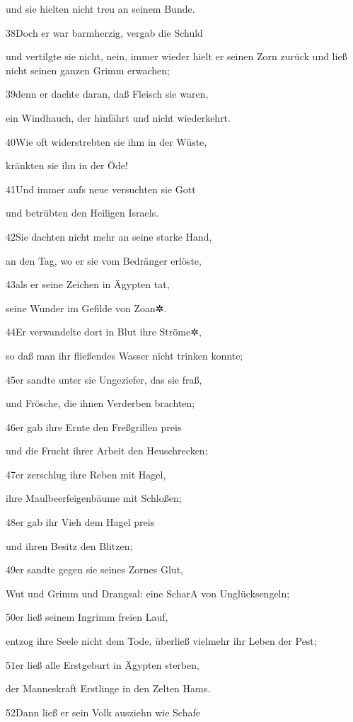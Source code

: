 und sie hielten nicht treu an seinem Bunde.

38Doch er war barmherzig, vergab die Schuld

und vertilgte sie nicht, nein, immer wieder hielt er seinen Zorn zurück
und ließ nicht seinen ganzen Grimm erwachen;

39denn er dachte daran, daß Fleisch sie waren,

ein Windhauch, der hinfährt und nicht wiederkehrt.

40Wie oft widerstrebten sie ihm in der Wüste,

kränkten sie ihn in der Öde!

41Und immer aufs neue versuchten sie Gott

und betrübten den Heiligen Israels.

42Sie dachten nicht mehr an seine starke Hand,

an den Tag, wo er sie vom Bedränger erlöste,

43als er seine Zeichen in Ägypten tat,

seine Wunder im Gefilde von Zoan✲.

44Er verwandelte dort in Blut ihre Ströme✲,

so daß man ihr fließendes Wasser nicht trinken konnte;

45er sandte unter sie Ungeziefer, das sie fraß,

und Frösche, die ihnen Verderben brachten;

46er gab ihre Ernte den Freßgrillen preis

und die Frucht ihrer Arbeit den Heuschrecken;

47er zerschlug ihre Reben mit Hagel,

ihre Maulbeerfeigenbäume mit Schloßen;

48er gab ihr Vieh dem Hagel preis

und ihren Besitz den Blitzen;

49er sandte gegen sie seines Zornes Glut,

Wut und Grimm und Drangsal: eine Schar{A} von Unglücksengeln;

50er ließ seinem Ingrimm freien Lauf,

entzog ihre Seele nicht dem Tode, überließ vielmehr ihr Leben der Pest;

51er ließ alle Erstgeburt in Ägypten sterben,

der Manneskraft Erstlinge in den Zelten Hams.

52Dann ließ er sein Volk ausziehn wie Schafe

